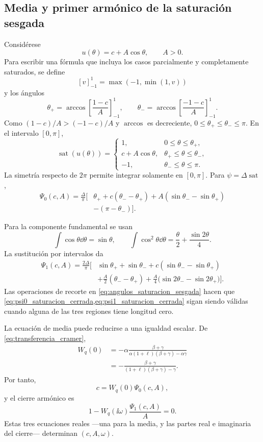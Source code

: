 \subsection{Media y primer armónico de la saturación sesgada}
\label{app:df_saturacion_sesgada}

Considérese
\[
u(\theta)=c+A\cos\theta,\qquad A>0.
\]
Para escribir una fórmula que incluya los casos parcialmente y completamente
saturados, se define
\[
[v]_{-1}^{1}=\max(-1,\min(1,v))
\]
y los ángulos
\begin{equation}
\theta_+
=\arccos\left[\frac{1-c}{A}\right]_{-1}^{1},
\qquad
\theta_-
=\arccos\left[\frac{-1-c}{A}\right]_{-1}^{1}.
\label{eq:angulos_saturacion_sesgada}
\end{equation}
Como \((1-c)/A>(-1-c)/A\) y \(\arccos\) es decreciente,
\(0\leq\theta_+\leq\theta_-\leq\pi\). En el intervalo
\([0,\pi]\),
\[
\operatorname{sat}(u(\theta))=
\begin{cases}
1,&0\leq\theta\leq\theta_+,\\
c+A\cos\theta,&\theta_+\leq\theta\leq\theta_-,\\
-1,&\theta_-\leq\theta\leq\pi.
\end{cases}
\]
La simetría respecto de \(2\pi\) permite integrar solamente en
\([0,\pi]\). Para \(\psi=\Delta\operatorname{sat}\),
\begin{align}
\Psi_0(c,A)
=\frac{\Delta}{\pi}\Big[
&\theta_+
+c(\theta_--\theta_+)
+A(\sin\theta_--\sin\theta_+)\nonumber\\
&-(\pi-\theta_-)
\Big].
\label{eq:psi0_saturacion_cerrada}
\end{align}

Para la componente fundamental se usan
\[
\int\cos\theta\dd\theta=\sin\theta,\qquad
\int\cos^2\theta\dd\theta
=\frac{\theta}{2}+\frac{\sin2\theta}{4}.
\]
La sustitución por intervalos da
\begin{align}
\Psi_1(c,A)
=\frac{2\Delta}{\pi}\Bigg[
&\sin\theta_++\sin\theta_-
+c(\sin\theta_--\sin\theta_+)\nonumber\\
&+\frac{A}{2}(\theta_--\theta_+)
+\frac{A}{4}
\bigl(\sin2\theta_--\sin2\theta_+\bigr)
\Bigg].
\label{eq:psi1_saturacion_cerrada}
\end{align}
Las operaciones de recorte en
\cref{eq:angulos_saturacion_sesgada} hacen que
\cref{eq:psi0_saturacion_cerrada,eq:psi1_saturacion_cerrada} sigan siendo
válidas cuando alguna de las tres regiones tiene longitud cero.

La ecuación de media puede reducirse a una igualdad escalar. De
\cref{eq:transferencia_cramer},
\begin{align}
W_q(0)
&=-\alpha
\frac{\beta+\gamma}
{\alpha(1+\ell)(\beta+\gamma)-\alpha\gamma}\nonumber\\
&=-\frac{\beta+\gamma}
{(1+\ell)(\beta+\gamma)-\gamma}.
\label{eq:ganancia_dc}
\end{align}
Por tanto,
\begin{equation}
c=W_q(0)\Psi_0(c,A),
\label{eq:cierre_dc_escalar}
\end{equation}
y el cierre armónico es
\[
1-W_q(\ii\omega)\frac{\Psi_1(c,A)}{A}=0.
\]
Estas tres ecuaciones reales ---una para la media, y las partes real e
imaginaria del cierre--- determinan \((c,A,\omega)\).

